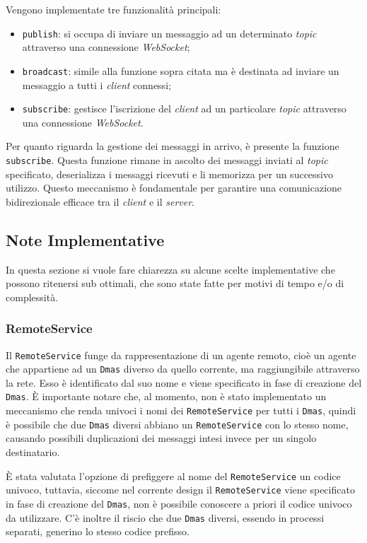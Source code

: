 Vengono implementate tre funzionalità principali:
\begin{itemize}
    \item \texttt{publish}: si occupa di inviare un messaggio ad un determinato \textit{topic} attraverso una connessione \textit{WebSocket};
    \item \texttt{broadcast}: simile alla funzione sopra citata ma è destinata ad inviare un messaggio a tutti i \textit{client} connessi;
    \item \texttt{subscribe}: gestisce l'iscrizione del \textit{client} ad un particolare \textit{topic} attraverso una connessione \textit{WebSocket}.
\end{itemize}

Per quanto riguarda la gestione dei messaggi in arrivo, è presente la funzione \texttt{subscribe}.
Questa funzione rimane in ascolto dei messaggi inviati al \textit{topic} specificato, deserializza i messaggi ricevuti e li memorizza per un successivo utilizzo.
Questo meccanismo è fondamentale per garantire una comunicazione bidirezionale efficace tra il \textit{client} e il  \textit{server}.

\subsection{Note Implementative}
In questa sezione si vuole fare chiarezza su alcune scelte implementative che possono ritenersi sub ottimali, che sono state fatte per motivi di tempo e/o di complessità.

\subsubsection{RemoteService}
Il \texttt{RemoteService} funge da rappresentazione di un agente remoto, cioè un agente che appartiene ad un \texttt{Dmas} diverso da quello corrente, ma raggiungibile attraverso la rete.
Esso è identificato dal suo nome e viene specificato in fase di creazione del \texttt{Dmas}. È importante notare che, al momento, non è stato implementato un meccanismo che renda
univoci i nomi dei \texttt{RemoteService} per tutti i \texttt{Dmas}, quindi è possibile che due \texttt{Dmas} diversi abbiano un \texttt{RemoteService} con lo stesso nome, causando possibili duplicazioni dei
messaggi intesi invece per un singolo destinatario.

È stata valutata l'opzione di prefiggere al nome del \texttt{RemoteService} un codice univoco, tuttavia, siccome nel corrente design il \texttt{RemoteService} viene specificato in fase di creazione
del \texttt{Dmas}, non è possibile conoscere a priori il codice univoco da utilizzare. C'è inoltre il riscio che due \texttt{Dmas} diversi, essendo in processi separati, generino lo stesso codice
prefisso.

